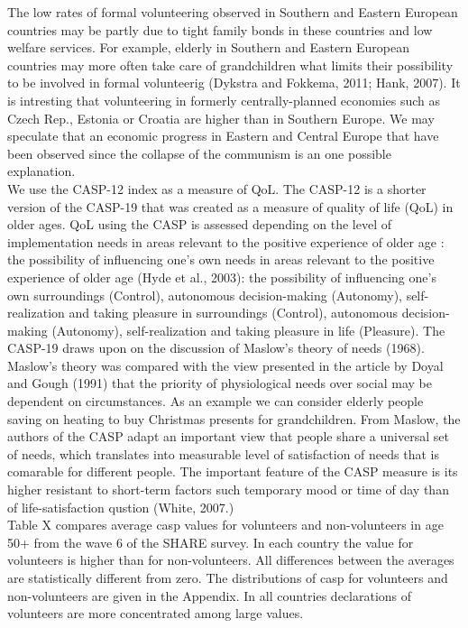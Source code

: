 \documentclass[10pt, letterpaper]{article}
\begin{document}
\begin{spacing}{1.4}
The low rates of formal volunteering observed in Southern and Eastern European countries may be partly due to tight family bonds in these countries and low welfare services. For example, elderly in Southern and Eastern European countries may more often take care of grandchildren what limits their possibility to be involved in formal volunteerig (Dykstra and Fokkema, 2011; Hank, 2007). It is  intresting that volunteering  in  formerly centrally-planned economies such as Czech Rep., Estonia or Croatia are higher than in Southern Europe. We may speculate that an economic progress in Eastern and Central Europe that have been observed since the collapse of the communism is an one possible explanation. \\


We use the CASP-12 index as a measure of QoL. The CASP-12 is a shorter version of the CASP-19 that was created as a measure of quality of life (QoL) in older ages. QoL using the CASP is assessed depending on the level of implementation needs in areas relevant to the positive experience of older age \cite{hyde03}: the possibility of influencing one's own	 needs in areas relevant to the positive experience of older age (Hyde et al., 2003): the possibility of influencing one's own  surroundings (Control), autonomous decision-making (Autonomy), self-realization and taking pleasure in	surroundings (Control), autonomous decision-making (Autonomy), self-realization and taking pleasure in  life (Pleasure). The CASP-19 draws upon on the discussion of Maslow's theory of needs (1968)\citep{borrat15}. Maslow's theory was compared with the view presented in the article by Doyal and Gough
(1991) that the priority of physiological needs over social may be dependent on circumstances.  As an example we can consider elderly people saving on heating to buy Christmas presents for grandchildren. From Maslow, the authors of the CASP adapt an important view that people share a universal set of needs, which translates into measurable level of satisfaction of needs that is comarable for different people. The important feature of the CASP measure is its higher resistant to short-term factors such temporary mood or time of day than of life-satisfaction qustion (White, 2007.) \\


Table X compares average casp values for volunteers and non-volunteers in age 50+ from the wave 6 of the SHARE survey. In each country the value for volunteers is higher than for non-volunteers.  All differences between the averages are statistically different from zero. The distributions of casp for volunteers and non-volunteers are given in the Appendix. In all countries declarations of volunteers are more concentrated among large values.  



\end{spacing}
\end{document}
